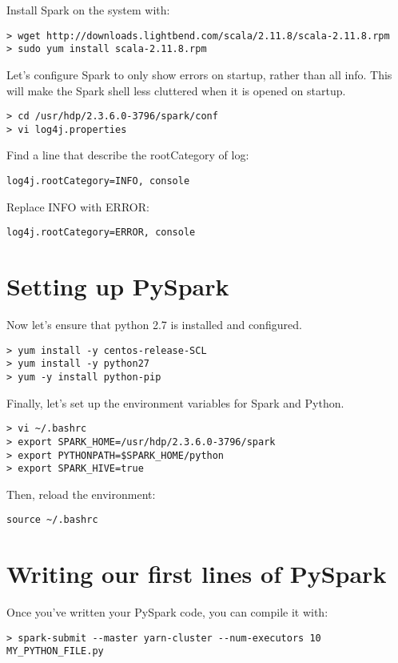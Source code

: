 \documentclass[9pt,twocolumn,twoside]{idsi}
\begin{document}
\noindent
Install Spark on the system with:
\begin{verbatim}
> wget http://downloads.lightbend.com/scala/2.11.8/scala-2.11.8.rpm
> sudo yum install scala-2.11.8.rpm
\end{verbatim}

\noindent
Let's configure Spark to only show errors on startup, rather than all info. This will make the Spark shell less cluttered when it is opened on startup.
\begin{verbatim}
> cd /usr/hdp/2.3.6.0-3796/spark/conf
> vi log4j.properties
\end{verbatim}

\noindent
Find a line that describe the rootCategory of log:
\begin{verbatim}
log4j.rootCategory=INFO, console
\end{verbatim}

Replace INFO with ERROR:
\begin{verbatim}
log4j.rootCategory=ERROR, console
\end{verbatim}

\section{Setting up PySpark}

Now let's ensure that python 2.7 is installed and configured.
\begin{verbatim}
> yum install -y centos-release-SCL
> yum install -y python27
> yum -y install python-pip
\end{verbatim}

\noindent
Finally, let's set up the environment variables for Spark and Python.
\begin{verbatim}
> vi ~/.bashrc
> export SPARK_HOME=/usr/hdp/2.3.6.0-3796/spark
> export PYTHONPATH=$SPARK_HOME/python
> export SPARK_HIVE=true
\end{verbatim}

Then, reload the environment:
\begin{verbatim}
source ~/.bashrc
\end{verbatim}

\section{Writing our first lines of PySpark}

Once you've written your PySpark code, you can compile it with:
\begin{verbatim}
> spark-submit --master yarn-cluster --num-executors 10 MY_PYTHON_FILE.py
\end{verbatim}
\end{document}
